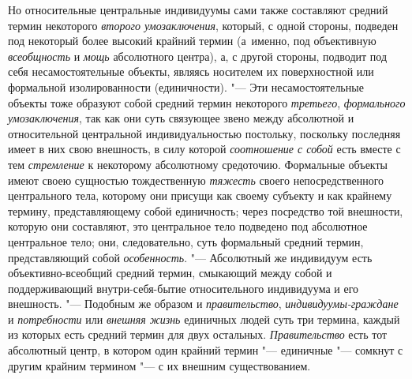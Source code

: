Но относительные центральные индивидуумы сами также составляют
средний термин некоторого {\em второго
умозаключения}, который, с одной стороны, подведен под
некоторый более высокий крайний термин (а~именно, под объективную
{\em всеобщность} и {\em мощь} абсолютного
центра), а, с другой стороны, подводит под себя несамостоятельные объекты,
являясь носителем их поверхностной или формальной изолированности
(единичности).
"--- Эти несамостоятельные объекты тоже образуют
собой средний термин некоторого
{\em третьего},
{\em формального умозаключения},
так как они суть связующее звено между абсолютной и
относительной центральной индивидуальностью постольку, поскольку последняя
имеет в них свою внешность, в силу которой
{\em соотношение с собой}
есть вместе с тем
{\em стремление} к
некоторому абсолютному средоточию. Формальные объекты имеют своею сущностью
тождественную {\em тяжесть}
своего непосредственного центрального тела, которому они
присущи как своему субъекту и как крайнему термину, представляющему собой
единичность; через посредство той внешности, которую они составляют, это
центральное тело подведено под абсолютное центральное тело; они,
следовательно, суть формальный средний термин, представляющий собой
{\em особенность}.
"--- Абсолютный же индивидуум есть объективно-всеобщий средний
термин, смыкающий между собой и поддерживающий внутри-себя-бытие
относительного индивидуума и его
внешность.
"--- \label{bkm:bm52b}Подобным же образом и
{\em правительство},
{\em индивидуумы-граждане
}и {\em потребности}
или {\em внешняя жизнь}
единичных людей суть три термина, каждый из которых есть
средний термин для двух остальных.
{\em Правительство} есть
тот абсолютный центр, в котором один крайний термин
"--- единичные "--- сомкнут с другим крайним
термином "--- с их внешним
существованием.
